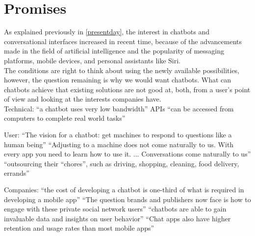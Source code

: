 \section{Promises}


As explained previously in \ref{presentday}, the interest in chatbots and conversational interfaces increased in recent time, because of the advancements made in the field of artificial intelligence and the popularity of messaging platforms, mobile devices, and personal assistants like Siri.
\\
The conditions are right to think about using the newly available possibilities, however, the question remaining is why we would want chatbots. What can chatbots achieve that existing solutions are not good at, both, from a user's point of view and looking at the interests companies have.
\\

Technical:
``a chatbot uses very low bandwidth''\cite{techinasia}
APIs ``can be accessed from computers to complete real world tasks''\cite{chatbotbook}

User:
``The vision for a chatbot: get machines to respond to questions like a human being''\cite{techinasia}
``Adjusting to a machine does not come naturally to us. With every app you need to learn how to use it. ... Conversations come naturally to us''\cite{techinasia}
``outsourcing their “chores”, such as driving, shopping, cleaning, food delivery, errands''\cite{chatbotbook}

Companies:
``the cost of developing a chatbot is one-third of what is required in developing a mobile app''\cite{techinasia}
``The question brands and publishers now face is how to engage with these private social network users''\cite{drum}
``chatbots are able to gain invaluable data and insights on user behavior''\cite{drum}
``Chat apps also have higher retention and usage rates than most mobile apps''\cite{businessinsider}


